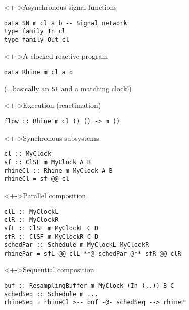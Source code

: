 \documentclass{enigtex-beamer-base}
\begin{document}
\begin{frame}[fragile]
\begin{block}<+->{Asynchronous signal functions}
\begin{verbatim}
data SN m cl a b -- Signal network
type family In cl
type family Out cl
\end{verbatim}
\end{block}
\begin{block}<+->{A clocked reactive program}
\begin{verbatim}
data Rhine m cl a b
\end{verbatim}
(...basically an \texttt{SF} and a matching clock!)
\end{block}
\begin{block}<+->{Execution (reactimation)}
\begin{verbatim}
flow :: Rhine m cl () () -> m ()
\end{verbatim}
\end{block}
\end{frame}

\begin{frame}[fragile]
\begin{block}<+->{Synchronous subsystems}
\begin{verbatim}
cl :: MyClock
sf :: ClSF m MyClock A B
rhineCl :: Rhine m MyClock A B
rhineCl = sf @@ cl
\end{verbatim}
\end{block}
\end{frame}

\begin{frame}[fragile]
\begin{block}<+->{Parallel composition}
\begin{verbatim}
clL :: MyClockL
clR :: MyClockR
sfL :: ClSF m MyClockL C D
sfR :: ClSF m MyClockR C D
schedPar :: Schedule m MyClockL MyClockR
rhinePar = sfL @@ clL **@ schedPar @** sfR @@ clR
\end{verbatim}
\end{block}
\begin{block}<+->{Sequential composition}
\begin{verbatim}
buf :: ResamplingBuffer m MyClock (In (..)) B C
schedSeq :: Schedule m ...
rhineSeq = rhineCl >-- buf -@- schedSeq --> rhineP
\end{verbatim}
\end{block}
\end{frame}

\begin{comment}
	Introduction what Rhine can do
	Basic vocab
		Arrowized FRP
		Synchronous subsystems
		Clocks
		Schedules
		Resampling buffers
		Events and behaviours
	Comparison (differences, +, -) to
		Yampa
		dunai, auto, varying
		classical FRP
		Pipes, conduit
	Further plan
		Mission statement what we want to implement
			Ideas
				FRP zoo
					Extra features?
				Tea time
					First without, then with GUI
		Given enough time, implement audience suggestions
\end{comment}
\end{document}
